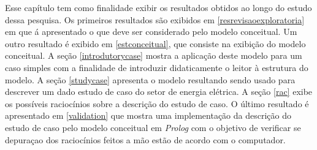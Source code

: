 Esse capítulo tem como finalidade exibir os resultados obtidos ao longo do estudo dessa pesquisa. Os primeiros resultados são exibidos em \ref{resrevisaoexploratoria} em que á apresentado o que deve ser considerado pelo modelo conceitual. Um outro resultado é exibido em \ref{estconceitual}, que consiste na exibição do modelo conceitual. A seção \ref{introdutorycase} mostra a aplicação deste modelo para um caso simples com a finalidade de introduzir didaticamente o leitor à estrutura do modelo. A seção  \ref{studycase} apresenta o modelo resultando sendo usado para descrever um dado estudo de caso do setor de energia elétrica. A seção \ref{rac} exibe os possíveis raciocínios sobre a descrição do estudo de caso. O último resultado é apresentado em \ref{validation} que mostra uma implementação da descrição do estudo de caso pelo modelo conceitual em \textit{Prolog} com o objetivo de verificar se depuraçao dos raciocínios feitos a mão estão de acordo com o computador.